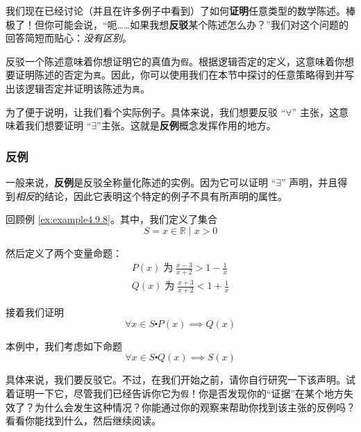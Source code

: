 我们现在已经讨论（并且在许多例子中看到）了如何\textbf{证明}任意类型的数学陈述。棒极了！但你可能会说，``呃……如果我想\textbf{反驳}某个陈述怎么办？''我们对这个问题的回答简短而贴心：\emph{没有区别}。 

反驳一个陈述意味着你想证明它的真值为\verb|假|。根据逻辑否定的定义，这意味着你想要证明陈述的否定为\verb|真|。因此，你可以使用我们在本节中探讨的任意策略得到并写出该逻辑否定并证明该陈述为\verb|真|。

为了便于说明，让我们看个实际例子。具体来说，我们想要反驳 ``$\forall$'' 主张，这意味着我们想要证明 ``$\exists$''主张。这就是\textbf{反例}概念发挥作用的地方。

\subsubsection*{反例}

一般来说，\textbf{反例}是反驳全称量化陈述的实例。因为它可以证明 ``$\exists$'' 声明，并且得到\emph{相反}的结论，因此它表明这个特定的例子不具有所声明的属性。\\

\begin{example}
    回顾例 \ref{ex:example4.9.8}。其中，我们定义了集合
    \[S = {x \in \mathbb{R} \mid x > 0}\]

    然后定义了两个变量命题：
    \begin{align*}
        P(x) \;\text{为}\; \frac{x-3}{x+2}>1-\frac{1}{x} \\
        Q(x) \;\text{为}\; \frac{x+3}{x+2}<1+\frac{1}{x}
    \end{align*}

    接着我们证明
    \[\forall x \in S \centerdot P(x) \implies Q(x)\]

    本例中，我们考虑如下命题
    \[\forall x \in S \centerdot Q(x) \implies S(x)\]
\end{example}

具体来说，我们要反驳它。不过，在我们开始之前，请你自行研究一下该声明。试着证明一下它，尽管我们已经告诉你它为\verb|假|！你是否发现你的``证据''在某个地方失效了？为什么会发生这种情况？你能通过你的观察来帮助你找到该主张的反例吗？看看你能找到什么，然后继续阅读。

